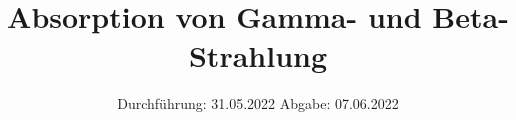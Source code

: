 

\subject{V704}
\title{Absorption von Gamma- und Beta-Strahlung}
\date{%
  Durchführung: 31.05.2022
  \hspace{3em}
  Abgabe: 07.06.2022
}



\maketitle
\thispagestyle{empty}
\tableofcontents
\newpage






\printbibliography{}

%


